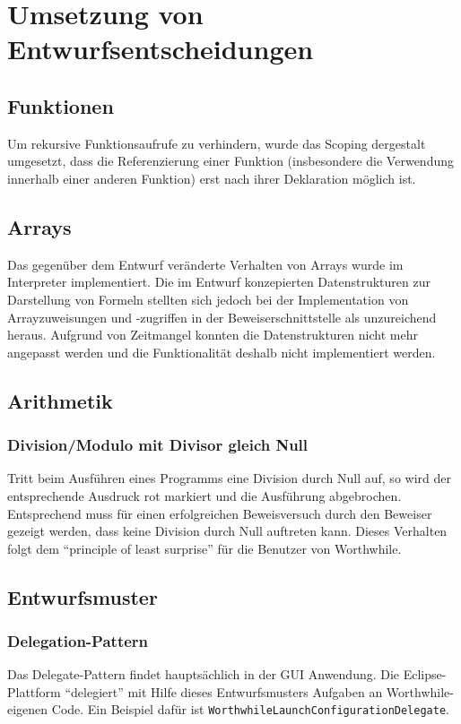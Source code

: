 \section{Umsetzung von Entwurfsentscheidungen}
\subsection{Funktionen}
Um rekursive Funktionsaufrufe zu verhindern, wurde das Scoping dergestalt umgesetzt, dass die Referenzierung einer Funktion (insbesondere die Verwendung innerhalb einer anderen Funktion) erst nach ihrer Deklaration möglich ist.

\subsection{Arrays}
Das gegenüber dem Entwurf veränderte Verhalten von Arrays wurde im Interpreter implementiert. Die im Entwurf konzepierten Datenstrukturen zur Darstellung von Formeln stellten sich jedoch bei der Implementation von Arrayzuweisungen und -zugriffen in der Beweiserschnittstelle als unzureichend heraus. Aufgrund von Zeitmangel konnten die Datenstrukturen nicht mehr angepasst werden und die Funktionalität deshalb nicht implementiert werden.

\subsection{Arithmetik}
\subsubsection{Division/Modulo mit Divisor gleich Null \label{umsetzung_division_null}}
Tritt beim Ausführen eines Programms eine Division durch Null auf, so wird der entsprechende Ausdruck rot markiert und die Ausführung abgebrochen. Entsprechend muss für einen erfolgreichen Beweisversuch durch den Beweiser gezeigt werden, dass keine Division durch Null auftreten kann. Dieses Verhalten folgt dem "`principle of least surprise"' für die Benutzer von Worthwhile.

\subsection{Entwurfsmuster}
\subsubsection{Delegation-Pattern}
Das Delegate-Pattern findet hauptsächlich in der GUI Anwendung. Die Eclipse-Plattform "`delegiert"' mit Hilfe dieses Entwurfsmusters Aufgaben an Worthwhile-eigenen Code. Ein Beispiel dafür ist \texttt{WorthwhileLaunchConfigurationDelegate}.

